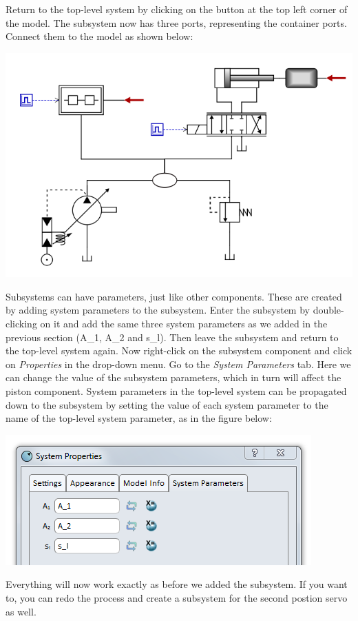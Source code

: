 \documentclass[a4paper,pdftex]{article}
\begin{document}
\begin{enumerate}
Return to the top-level system by clicking on the button at the top left corner of the model. The subsystem now has three ports, representing the container ports. Connect them to the model as shown below:

\includegraphics[width=0.85\linewidth]{gfx/advancedusage/connectedsubsystem.png}

Subsystems can have parameters, just like other components. These are created by adding system parameters to the subsystem. Enter the subsystem by double-clicking on it and add the same three system parameters as we added in the previous section (A\_1, A\_2 and s\_l). Then leave the subsystem and return to the top-level system again. Now right-click on the subsystem component and click on \textit{Properties} in the drop-down menu. Go to the \textit{System Parameters} tab. Here we can change the value of the subsystem parameters, which in turn will affect the piston component. System parameters in the top-level system can be propagated down to the subsystem by setting the value of each system parameter to the name of the top-level system parameter, as in the figure below:

\includegraphics[width=0.6\linewidth]{gfx/advancedusage/subsystemparameters.png}

Everything will now work exactly as before we added the subsystem. If you want to, you can redo the process and create a subsystem for the second postion servo as well.

\end{enumerate}
\end{document}
